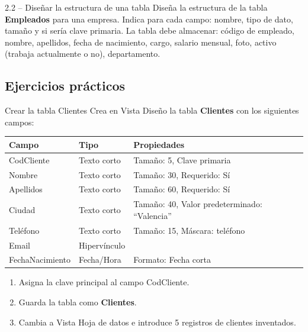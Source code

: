 \documentclass[12pt,a4paper]{article}
\begin{document}
\begin{ejercicio}{2.2 -- Diseñar la estructura de una tabla}
Diseña la estructura de la tabla \textbf{Empleados} para una empresa. Indica para cada campo: nombre, tipo de dato, tamaño y si sería clave primaria. La tabla debe almacenar: código de empleado, nombre, apellidos, fecha de nacimiento, cargo, salario mensual, foto, activo (trabaja actualmente o no), departamento.
\end{ejercicio}

\subsection{Ejercicios prácticos}

\begin{practica}{Crear la tabla Clientes}
Crea en Vista Diseño la tabla \textbf{Clientes} con los siguientes campos:

\begin{center}
\renewcommand{\arraystretch}{1.3}
\begin{tabular}{|l|l|l|}
\hline
\textbf{Campo} & \textbf{Tipo} & \textbf{Propiedades} \\
\hline
CodCliente & Texto corto & Tamaño: 5, Clave primaria \\
Nombre & Texto corto & Tamaño: 30, Requerido: Sí \\
Apellidos & Texto corto & Tamaño: 60, Requerido: Sí \\
Ciudad & Texto corto & Tamaño: 40, Valor predeterminado: ``Valencia'' \\
Teléfono & Texto corto & Tamaño: 15, Máscara: teléfono \\
Email & Hipervínculo & \\
FechaNacimiento & Fecha/Hora & Formato: Fecha corta \\
\hline
\end{tabular}
\end{center}

\begin{enumerate}[label=\alph*)]
  \item Asigna la clave principal al campo CodCliente.
  \item Guarda la tabla como \textbf{Clientes}.
  \item Cambia a Vista Hoja de datos e introduce 5 registros de clientes inventados.
\end{enumerate}
\end{practica}
\end{document}
